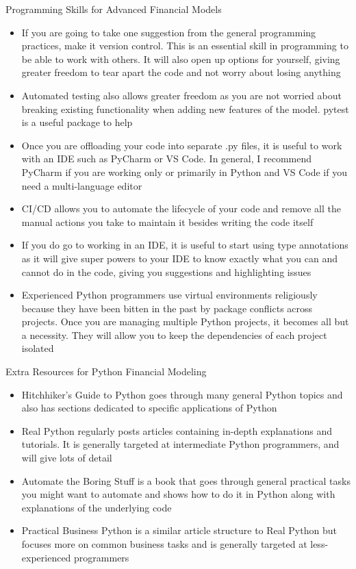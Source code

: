 \documentclass[]{article}
\begin{document}
\begin{section}{Programming Skills for Advanced Financial Models}
\begin{itemize}
\item If you are going to take one suggestion from the general programming practices, make it version control. This is an essential skill in programming to be able to work with others. It will also open up options for yourself, giving greater freedom to tear apart the code and not worry about losing anything
\item Automated testing also allows greater freedom as you are not worried about breaking existing functionality when adding new features of the model. pytest is a useful package to help
\item Once you are offloading your code into separate .py files, it is useful to work with an IDE such as PyCharm or VS Code. In general, I recommend PyCharm if you are working only or primarily in Python and VS Code if you need a multi-language editor
\item CI/CD allows you to automate the lifecycle of your code and remove all the manual actions you take to maintain it besides writing the code itself
\item If you do go to working in an IDE, it is useful to start using type annotations as it will give super powers to your IDE to know exactly what you can and cannot do in the code, giving you suggestions and highlighting issues
\item Experienced Python programmers use virtual environments religiously because they have been bitten in the past by package conflicts across projects. Once you are managing multiple Python projects, it becomes all but a necessity. They will allow you to keep the dependencies of each project isolated
\end{itemize}
\end{section}
\begin{section}{Extra Resources for Python Financial Modeling}
\begin{itemize}
\item Hitchhiker's Guide to Python goes through many general Python topics and also has sections dedicated to specific applications of Python
\item Real Python regularly posts articles containing in-depth explanations and tutorials. It is generally targeted at intermediate Python programmers, and will give lots of detail
\item Automate the Boring Stuff is a book that goes through general practical tasks you might want to automate and shows how to do it in Python along with explanations of the underlying code
\item Practical Business Python is a similar article structure to Real Python but focuses more on common business tasks and is generally targeted at less-experienced programmers
\end{itemize}
\end{section}
\end{document}
